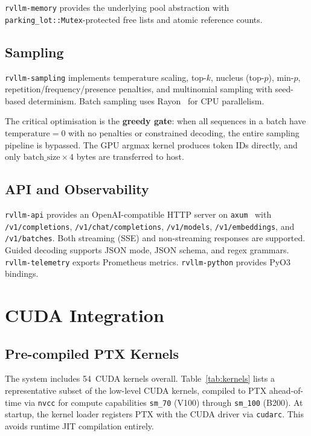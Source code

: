 \texttt{rvllm-memory} provides the underlying pool abstraction with
\texttt{parking\_lot::Mutex}-protected free lists and atomic reference counts.

\subsection{Sampling}

\texttt{rvllm-sampling} implements temperature scaling, top-$k$, nucleus (top-$p$),
min-$p$, repetition/frequency/presence penalties, and multinomial sampling with
seed-based determinism. Batch sampling uses Rayon~\cite{rayon2023} for CPU parallelism.

The critical optimisation is the \textbf{greedy gate}: when all sequences in a batch
have $\text{temperature} = 0$ with no penalties or constrained decoding, the entire
sampling pipeline is bypassed. The GPU argmax kernel produces token IDs directly,
and only $\text{batch\_size} \times 4$ bytes are transferred to host.

\subsection{API and Observability}

\texttt{rvllm-api} provides an OpenAI-compatible HTTP server on
\texttt{axum}~\cite{axum2023} with \texttt{/v1/completions},
\texttt{/v1/chat/completions}, \texttt{/v1/models}, \texttt{/v1/embeddings}, and
\texttt{/v1/batches}. Both streaming (SSE) and non-streaming responses are supported.
Guided decoding supports JSON mode, JSON schema, and regex grammars.
\texttt{rvllm-telemetry} exports Prometheus metrics. \texttt{rvllm-python} provides
PyO3 bindings.

\section{CUDA Integration}
\label{sec:cuda}

\subsection{Pre-compiled PTX Kernels}

The system includes 54~CUDA kernels overall. Table~\ref{tab:kernels} lists a
representative subset of the low-level CUDA kernels, compiled to PTX ahead-of-time via \texttt{nvcc} for compute capabilities
\texttt{sm\_70} (V100) through \texttt{sm\_100} (B200). At startup, the kernel
loader registers PTX with the CUDA driver via \texttt{cudarc}. This avoids runtime
JIT compilation entirely.

